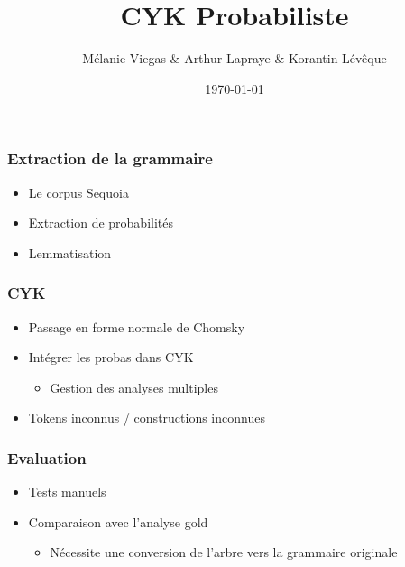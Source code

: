 \documentclass{beamer}
\begin{document}
\title{CYK Probabiliste}  %
\author{Mélanie Viegas \& Arthur Lapraye \& Korantin Lévêque}

\date{\today}


\begin{frame}
 \maketitle
\end{frame}




\begin{frame}
\frametitle{Extraction de la grammaire}

\begin{itemize}
 \item<1-3> Le corpus Sequoia
 \item<2-3> Extraction de probabilités
 \item<3-3> Lemmatisation
\end{itemize}

 
\end{frame}

\begin{frame}
\frametitle{CYK}
	\begin{itemize}
		\item<1-3>{Passage en forme normale de Chomsky}
		\item<2-3>{Intégrer les probas dans CYK}
		\begin{itemize}
			\item<2-3>{Gestion des analyses multiples}
		\end{itemize}
		\item<3>{Tokens inconnus / constructions inconnues}
 \end{itemize}

 
\end{frame}

\begin{frame}
\frametitle{Evaluation}
 \begin{itemize}
  
  \item<1-3>{Tests manuels}
  
  \item<2-3>{Comparaison avec l'analyse gold}
  \begin{itemize}
   \item<3-3>{Nécessite une conversion de l'arbre vers la grammaire originale}
  \end{itemize}

 \end{itemize}

\end{frame}
\end{document}
